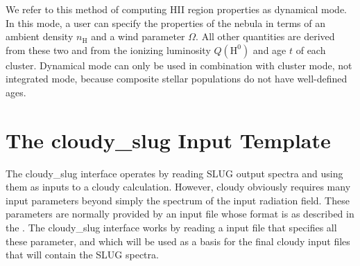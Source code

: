 \documentclass[letterpaper,10pt,english]{sphinxmanual}
\begin{document}
We refer to this method of computing HII region properties as
dynamical mode. In this mode, a user can specify the properties of the
nebula in terms of an ambient density \(n_{\mathrm{H}}\) and
a wind parameter \(\Omega\). All other quantities are
derived from these two and from the ionizing luminosity
\(Q(\mathrm{H}^0)\) and age \(t\) of each cluster. Dynamical
mode can only be used in combination with cluster mode, not integrated
mode, because composite stellar populations do not have well-defined
ages.


\section{The cloudy\_slug Input Template}
\label{\detokenize{cloudy:the-cloudy-slug-input-template}}\label{\detokenize{cloudy:ssec-cloudy-template}}
The cloudy\_slug interface operates by reading SLUG output spectra and
using them as inputs to a cloudy calculation. However, cloudy
obviously requires many input parameters beyond simply the spectrum of
the input radiation field. These parameters are normally provided by
an input file whose format is as described in the . The cloudy\_slug interface works by reading a
 input file that specifies all these parameter, and which
will be used as a basis for the final cloudy input files that will
contain the SLUG spectra.
\end{document}
